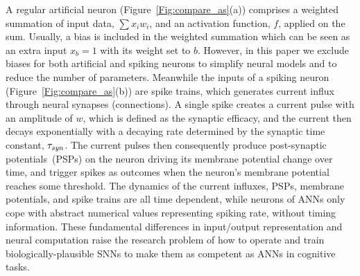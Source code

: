 \documentclass{article}
\begin{document}
	A regular artificial neuron (Figure~\ref{Fig:compare_as}(a)) comprises a weighted summation of input data, $\sum x_i w_i$, and an activation function, $f$, applied on the sum.
	Usually, a bias is included in the weighted summation which can be seen as an extra input $x_b = 1$ with its weight set to $b$.
	However, in this paper we exclude biases for both artificial and spiking neurons to simplify neural models and to reduce the number of parameters.
	Meanwhile the inputs of a spiking neuron (Figure~\ref{Fig:compare_as}(b)) are spike trains, which generates current influx through neural synapses (connections).
	A single spike creates a current pulse with an amplitude of $w$, which is defined as the synaptic efficacy, and the current then decays exponentially with a decaying rate determined by the synaptic time constant, $\tau_{\textit{\textrm{syn}}}$.
	The current pulses then consequently produce post-synaptic potentials~(PSPs) on the neuron driving its membrane potential change over time, and trigger spikes as outcomes when the neuron's membrane potential reaches some threshold.
	The dynamics of the current influxes, PSPs, membrane potentials, and spike trains are all time dependent, while neurons of ANNs only cope with abstract numerical values representing spiking rate, without timing information.
	These fundamental differences in input/output representation and neural computation raise the research problem of how to operate and train biologically-plausible SNNs to make them as competent as ANNs in cognitive tasks.
	
\end{document}
